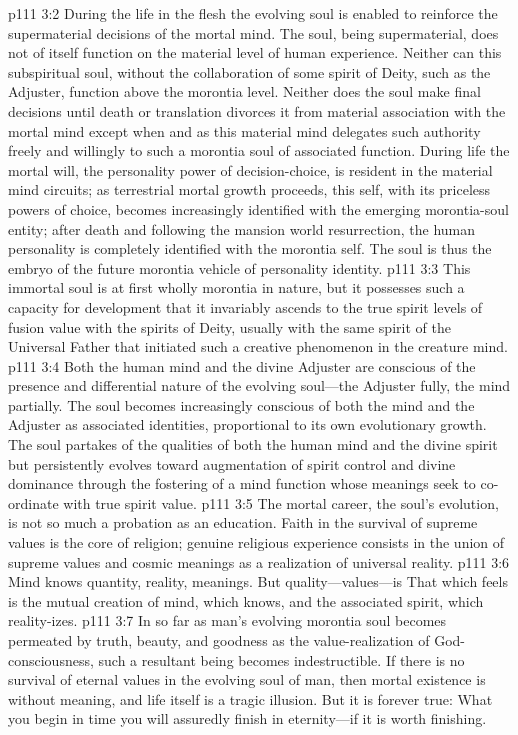 \vs p111 3:2 During the life in the flesh the evolving soul is enabled to reinforce the supermaterial decisions of the mortal mind. The soul, being supermaterial, does not of itself function on the material level of human experience. Neither can this subspiritual soul, without the collaboration of some spirit of Deity, such as the Adjuster, function above the morontia level. Neither does the soul make final decisions until death or translation divorces it from material association with the mortal mind except when and as this material mind delegates such authority freely and willingly to such a morontia soul of associated function. During life the mortal will, the personality power of decision\hyp{}choice, is resident in the material mind circuits; as terrestrial mortal growth proceeds, this self, with its priceless powers of choice, becomes increasingly identified with the emerging morontia\hyp{}soul entity; after death and following the mansion world resurrection, the human personality is completely identified with the morontia self. The soul is thus the embryo of the future morontia vehicle of personality identity.
\vs p111 3:3 This immortal soul is at first wholly morontia in nature, but it possesses such a capacity for development that it invariably ascends to the true spirit levels of fusion value with the spirits of Deity, usually with the same spirit of the Universal Father that initiated such a creative phenomenon in the creature mind.
\vs p111 3:4 Both the human mind and the divine Adjuster are conscious of the presence and differential nature of the evolving soul---the Adjuster fully, the mind partially. The soul becomes increasingly conscious of both the mind and the Adjuster as associated identities, proportional to its own evolutionary growth. The soul partakes of the qualities of both the human mind and the divine spirit but persistently evolves toward augmentation of spirit control and divine dominance through the fostering of a mind function whose meanings seek to co\hyp{}ordinate with true spirit value.
\vs p111 3:5 The mortal career, the soul’s evolution, is not so much a probation as an education. Faith in the survival of supreme values is the core of religion; genuine religious experience consists in the union of supreme values and cosmic meanings as a realization of universal reality.
\vs p111 3:6 Mind knows quantity, reality, meanings. But quality---values---is  That which feels is the mutual creation of mind, which knows, and the associated spirit, which reality\hyp{}izes.
\vs p111 3:7 In so far as man’s evolving morontia soul becomes permeated by truth, beauty, and goodness as the value\hyp{}realization of God\hyp{}consciousness, such a resultant being becomes indestructible. If there is no survival of eternal values in the evolving soul of man, then mortal existence is without meaning, and life itself is a tragic illusion. But it is forever true: What you begin in time you will assuredly finish in eternity---if it is worth finishing.
